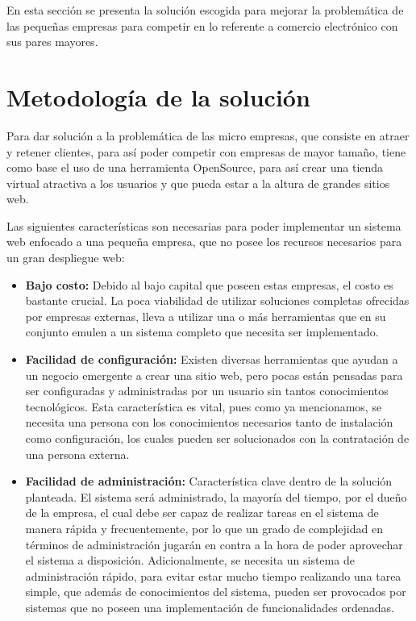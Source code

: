 En esta sección se presenta la solución escogida
para mejorar la problemática de las pequeñas empresas para competir en lo
referente a comercio electrónico con sus pares mayores.

\section{Metodología de la solución}
\label{sec:4.1}

Para dar solución a la problemática de las micro empresas,
que consiste en atraer y retener clientes, para así poder competir
con empresas de mayor tamaño, tiene como base el uso de una herramienta
OpenSource, para así crear una tienda virtual atractiva a los usuarios
y que pueda estar a la altura de grandes sitios web.

Las siguientes características son necesarias para poder implementar un sistema
web enfocado a una pequeña empresa, que no posee los recursos necesarios
para un gran despliegue web:

\begin{itemize}
    \item {\bf Bajo costo:}
        Debido al bajo capital que poseen estas empresas, el costo
        es bastante crucial.
        La poca viabilidad de utilizar soluciones completas ofrecidas
        por empresas externas, lleva a utilizar una o más herramientas
        que en su conjunto emulen a un sistema completo que necesita ser
        implementado.

    \item {\bf Facilidad de configuración:}
        Existen diversas herramientas que ayudan a un negocio emergente a crear
        una sitio web, pero pocas están pensadas para ser configuradas y administradas
	por un usuario sin tantos conocimientos tecnológicos.
        Esta característica es vital, pues como ya mencionamos,
        se necesita una persona con los conocimientos necesarios tanto
        de instalación como configuración, los cuales pueden ser solucionados
        con la contratación de una persona externa.

    \item {\bf Facilidad de administración:}
        Característica clave dentro de la solución planteada.
        El sistema será administrado, la mayoría del tiempo, por el dueño de la
        empresa, el cual debe ser capaz de realizar tareas en el sistema
        de manera rápida y frecuentemente, por lo que un grado
        de complejidad en términos de administración jugarán en contra
        a la hora de poder aprovechar el sistema a disposición.
        Adicionalmente, se necesita un sistema de administración rápido,
        para evitar estar mucho tiempo realizando una tarea simple, que
        además de conocimientos del sistema, pueden ser provocados por sistemas
        que no poseen una implementación de funcionalidades ordenadas.

\end{itemize}


